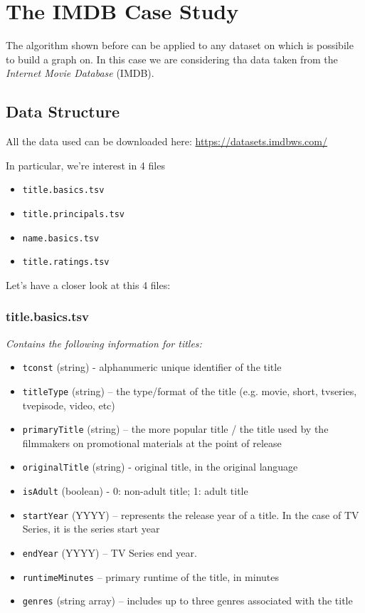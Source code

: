\section{The IMDB Case Study}
The algorithm shown before can be applied to any dataset on which is possibile to build a graph on. In this case we are considering tha data taken from the \emph{Internet Movie Database} (IMDB).

\subsection{Data Structure}
All the data used can be downloaded here: \url{https://datasets.imdbws.com/} \s

\noindent In particular, we're interest in 4 files
\begin{itemize}
    \item \texttt{title.basics.tsv}
    \item \texttt{title.principals.tsv}
    \item \texttt{name.basics.tsv}
    \item \texttt{title.ratings.tsv}
\end{itemize}
Let's have a closer look at this 4 files:

\subsubsection*{title.basics.tsv}
\emph{Contains the following information for titles:}
\begin{itemize}
    \item \texttt{tconst} (string) - alphanumeric unique identifier of the title
    \item \texttt{titleType} (string) – the type/format of the title (e.g. movie, short, tvseries, tvepisode, video, etc)
    \item \texttt{primaryTitle} (string) – the more popular title / the title used by the filmmakers on promotional materials at the point of release
    \item \texttt{originalTitle} (string) - original title, in the original language
    \item \texttt{isAdult} (boolean) - 0: non-adult title; 1: adult title
    \item \texttt{startYear} (YYYY) – represents the release year of a title. In the case of TV Series, it is the series start year
    \item \texttt{endYear} (YYYY) – TV Series end year.
    \item \texttt{runtimeMinutes} – primary runtime of the title, in minutes
    \item \texttt{genres} (string array) – includes up to three genres associated with the title
\end{itemize}

